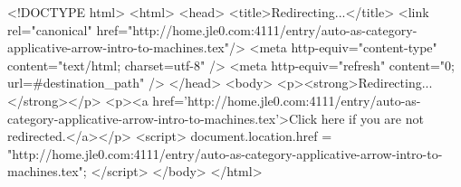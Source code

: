 <!DOCTYPE html>
<html>
<head>
<title>Redirecting...</title>
<link rel="canonical" href="http://home.jle0.com:4111/entry/auto-as-category-applicative-arrow-intro-to-machines.tex"/>
<meta http-equiv="content-type" content="text/html; charset=utf-8" />
<meta http-equiv="refresh" content="0; url=#{destination_path}" />
</head>
<body>
  <p><strong>Redirecting...</strong></p>
  <p><a href='http://home.jle0.com:4111/entry/auto-as-category-applicative-arrow-intro-to-machines.tex'>Click here if you are not redirected.</a></p>
  <script>
    document.location.href = "http://home.jle0.com:4111/entry/auto-as-category-applicative-arrow-intro-to-machines.tex";
  </script>
</body>
</html>
